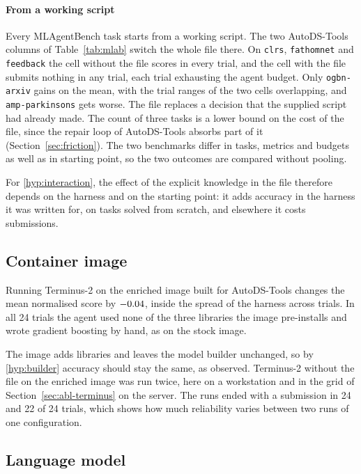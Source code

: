 \paragraph{From a working script}
\label{sec:abl-script}
Every MLAgentBench task starts from a working script. The two AutoDS-Tools
columns of Table~\ref{tab:mlab} switch the whole file there. On
\texttt{clrs}, \texttt{fathomnet} and \texttt{feedback} the cell without the
file scores in every trial, and the cell with the file submits nothing in
any trial, each trial exhausting the agent budget. Only
\texttt{ogbn-arxiv} gains on the mean, with the trial ranges of the two
cells overlapping, and \texttt{amp-parkinsons} gets worse. The file replaces a decision that the
supplied script had already made. The count of three tasks is a lower bound
on the cost of the file, since the repair loop of AutoDS-Tools absorbs part
of it (Section~\ref{sec:friction}). The two benchmarks differ in tasks,
metrics and budgets as well as in starting point, so the two outcomes are
compared without pooling.

For \ref{hyp:interaction}, the effect of the explicit knowledge in the file therefore depends on the
harness and on the starting point: it adds accuracy in the harness it was written for, on tasks solved
from scratch, and elsewhere it costs submissions.

\subsection{Container image}
\label{sec:abl-image}

Running Terminus-2 on the enriched image built for AutoDS-Tools changes the
mean normalised score by $-0.04$, inside the spread of the harness
across trials. In all 24 trials the agent used none of the three libraries
the image pre-installs and wrote gradient boosting by hand, as on the stock
image.

The image adds libraries and leaves the model builder unchanged, so by
\ref{hyp:builder} accuracy should stay the same, as observed. Terminus-2
without the file on the enriched image was run twice, here on a workstation
and in the grid of Section~\ref{sec:abl-terminus} on the server. The runs
ended with a submission in 24 and 22 of 24 trials, which shows how much
reliability varies between two runs of one configuration.

\subsection{Language model}
\label{sec:abl-language-model}

